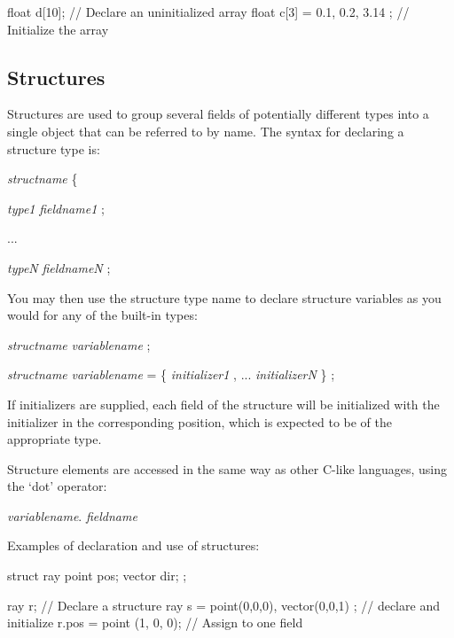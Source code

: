 \documentclass[11pt,letterpaper]{book}
\begin{document}
\begin{code}
    float d[10];                       // Declare an uninitialized array
    float c[3] = { 0.1, 0.2, 3.14 };   // Initialize the array
\end{code}

\subsection{Structures}

Structures are used to group several fields of potentially different
types into a single object that can be referred to by name.  The syntax
for declaring a structure type is:

\vspace{12pt}
 \emph{structname} {\cf \{} 

\spc\spc \emph{type1} \emph{fieldname1} {\cf ;}

\spc\spc ...

\spc\spc \emph{typeN} \emph{fieldnameN} {\cf ;}

\spc {\cf \} ;}
\vspace{12pt}

You may then use the structure type name to declare structure variables
as you would for any of the built-in types:

\vspace{12pt}
\spc \emph{structname} \emph{variablename} {\cf ;}

\spc \emph{structname} \emph{variablename} {\cf = \{ }
\emph{initializer1} {\cf ,} ... \emph{initializerN} {\cf \} ;}
\vspace{12pt}

If initializers are supplied, each field of the structure will be
initialized with the initializer in the corresponding position, which
is expected to be of the appropriate type.

Structure elements are accessed in the same way as other C-like
languages, using the `dot' operator: 

\vspace{12pt}
\spc \emph{variablename}{\cf .} \emph{fieldname}
\vspace{12pt}

Examples of declaration and use of structures:

\begin{code}
    struct ray {
        point pos;
        vector dir;
    };

    ray r;   // Declare a structure
    ray s = { point(0,0,0), vector(0,0,1) };  // declare and initialize
    r.pos = point (1, 0, 0);  // Assign to one field
\end{code}
\end{document}

